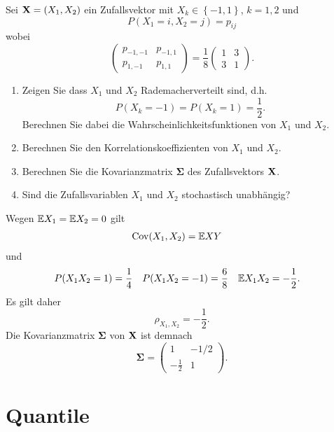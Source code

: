  Sei $\mathbf X = (X_1, X_2)$ ein Zufallsvektor mit
$X_k \in \left\{ -1, 1 \right\}$, $k=1,2$ und \[P(X_1=i, X_2=j)=p_{ij}\] wobei
\begin{equation*}
    \begin{pmatrix}
        p_{-1,-1} & p_{-1, 1} \\
        p_{1,-1} & p_{1,1}
    \end{pmatrix}
    = \frac{1}{8}
    \begin{pmatrix}
        1 & 3 \\
        3 & 1
    \end{pmatrix}.
\end{equation*}
\begin{enumerate}
    \item Zeigen Sie dass $X_1$ und $X_2$ Rademacherverteilt sind, d.h.\ 
        \[P(X_k = -1) = P(X_k = 1) = \frac{1}{2}. \]
        Berechnen Sie dabei die Wahrscheinlichkeitsfunktionen von $X_1$ und $X_2$. 

    \item Berechnen Sie den Korrelationskoeffizienten von $X_1$ und $X_2$.
    \item Berechnen Sie die Kovarianzmatrix $\mathbf \Sigma$ des Zufallsvektors $\mathbf X$.
    \item Sind die Zufallsvariablen $X_1$ und $X_2$ stochastisch unabhängig?
\end{enumerate}

\solution 
Wegen $\mathbb{E} X_1 = \mathbb{E} X_2 = 0$ gilt
\begin{align*}
    \operatorname{Cov}(X_1, X_2) &= \mathbb{E} XY
\end{align*}
und
\begin{align*}
    P(X_{1} X_{2} = 1) &= \frac{1}{4} & 
    P(X_{1} X_{2} = -1) &= \frac{6}{8} &
    \mathbb{E} X_{1}X_{2} &= -\frac{1}{2}. 
\end{align*}
Es gilt daher 
\begin{equation*}
   \rho_{X_1,X_2} = -\frac{1}{2}.
\end{equation*}
Die Kovarianzmatrix $\mathbf \Sigma$ von $\mathbf X$ ist demnach
\begin{equation*}
    \mathbf \Sigma = \begin{pmatrix}
        1 & -1/2 \\
        -\frac{1}{2} & 1
    \end{pmatrix}.
\end{equation*}



\section{Quantile}

